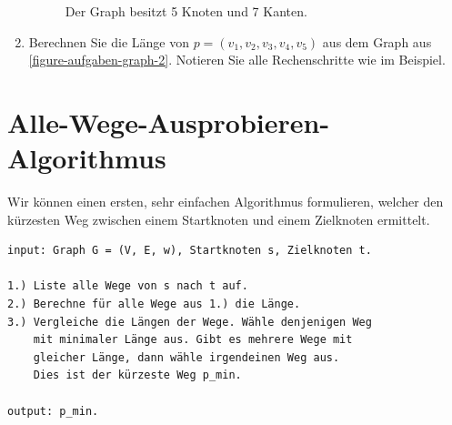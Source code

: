 \begin{enumerate}
\begin{figure}[htb]
\centering
{}
\caption{Der Graph besitzt 5 Knoten und 7 Kanten.}
\label{figure-aufgaben-graph-2}
\end{figure}

\fillwithgrid{2in}

\item Berechnen Sie die Länge von $p = (v_1, v_2, v_3, v_4, v_5)$ aus dem Graph aus \autoref{figure-aufgaben-graph-2}. Notieren Sie alle Rechenschritte wie im Beispiel.


\end{enumerate}

\newpage

\section{Alle-Wege-Ausprobieren-Algorithmus}

Wir können einen ersten, sehr einfachen Algorithmus formulieren, welcher den kürzesten Weg zwischen einem Startknoten und einem Zielknoten ermittelt.

\begin{lstlisting}[language={pseudocode}, caption={Ein Brute-Force-Algorithmus für das Kürzeste-Weg-Problem.}, label={lst-algo-shortest-path-brute-force}]
input: Graph G = (V, E, w), Startknoten s, Zielknoten t.

1.) Liste alle Wege von s nach t auf.
2.) Berechne für alle Wege aus 1.) die Länge.
3.) Vergleiche die Längen der Wege. Wähle denjenigen Weg 
    mit minimaler Länge aus. Gibt es mehrere Wege mit 
    gleicher Länge, dann wähle irgendeinen Weg aus.
    Dies ist der kürzeste Weg p_min. 
  
output: p_min.
\end{lstlisting}


